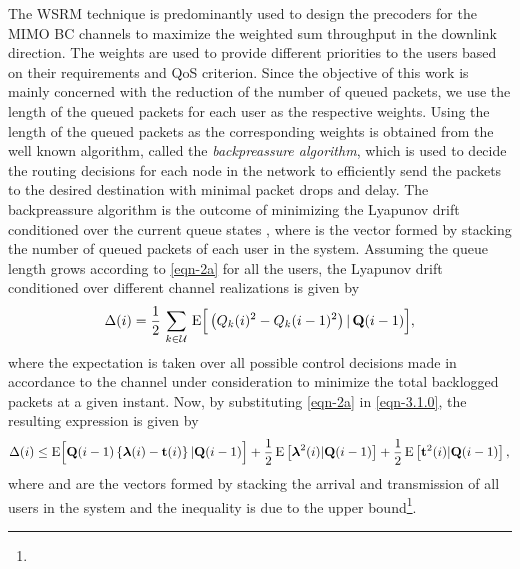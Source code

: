 
The \ac{WSRM} technique is predominantly used to design the precoders for the \ac{MIMO} \ac{BC} channels to maximize the weighted sum throughput in the downlink direction. The weights are used to provide different priorities to the users based on their requirements and \ac{QoS} criterion. Since the objective of this work is mainly concerned with the reduction of the number of queued packets, we use the length of the queued packets for each user as the respective weights. Using the length of the queued packets as the corresponding weights is obtained from the well known algorithm, called the \textit{backpreassure algorithm}, which is used to decide the routing decisions for each node in the network to efficiently send the packets to the desired destination with minimal packet drops and delay. The backpreassure algorithm is the outcome of minimizing the Lyapunov drift conditioned over the current queue states , where  is the vector formed by stacking the number of queued packets of each user in the system. Assuming the queue length grows according to \eqref{eqn-2a} for all the users, the Lyapunov drift conditioned over different channel realizations is given by
\begin{equation} \label{eqn-3.1.0}
\Delta(i) = \frac{1}{2} \, \sum_{k \in \mc{U}} \, \mathrm{E} \Big{[}  \left ( Q_k(i)^2 - Q_k(i-1)^2 \right ) \vert \, \mbf{Q}(i - 1) \Big{]},
\end{equation}
where the expectation is taken over all possible control decisions made in accordance to the channel under consideration to minimize the total backlogged packets at a given instant. Now, by substituting \eqref{eqn-2a} in \eqref{eqn-3.1.0}, the resulting expression is given by
\begin{equation}
\Delta(i) \leq \mathrm{E} \Big{[} \mbf{Q}(i-1) \left \lbrace \mbfa{\lambda}(i) - \mbf{t}(i) \right \rbrace | \mbf{Q}(i-1) \Big{]} + \frac{1}{2} \,\mathrm{E} \left [ \mbfa{\lambda}^2(i) | \mbf{Q}(i-1) \right ] + \frac{1}{2} \,\mathrm{E} \left [ \mbf{t}^2(i) | \mbf{Q}(i-1) \right ],
\label{drift-exp}
\end{equation}
where \me{\mbfa{\lambda}} and  are the vectors formed by stacking the arrival and transmission of all users in the system and the inequality is due to the upper bound\footnote{}.


